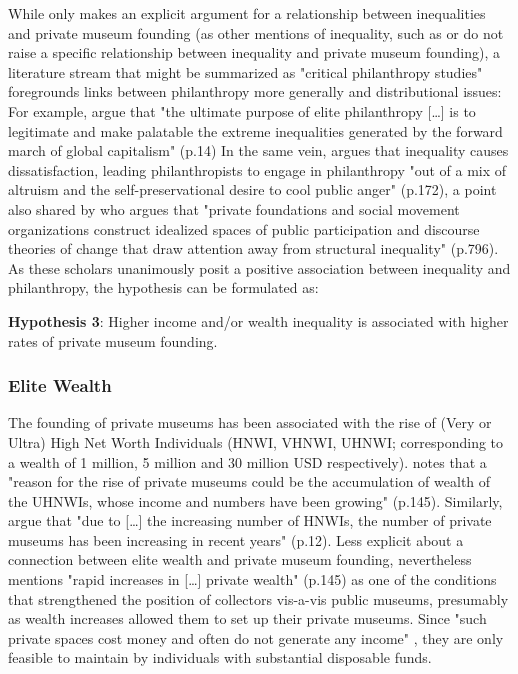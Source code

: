 \documentclass[11pt, authoryear]{elsarticle}
\begin{document}
While only \citet{Brown_2019_private}  makes an explicit argument for a relationship between inequalities and private museum founding (as other mentions of inequality, such as \citet{KalbCosmo_2020_museum} or \citet{Adam_2021_rise} do not raise a specific relationship between inequality and private museum founding), a literature stream that might be summarized as "critical philanthropy studies" foregrounds links between philanthropy more generally and distributional issues:
For example, \citet{Maclean_etal_2021_philanthropy} argue that "the ultimate purpose of elite philanthropy [\ldots{}] is to legitimate and make palatable the extreme inequalities generated by the forward march of global capitalism" (p.14)
In the same vein, \citet{Giridharadas_2018_winners} argues that inequality causes dissatisfaction, leading philanthropists to engage in philanthropy "out of a mix of altruism and the self-preservational desire to cool public anger" (p.172), a point also shared by \citet{KohlArenas_2015_selfhelp} who argues that "private foundations and social movement organizations construct idealized spaces of public participation and discourse theories of change that draw attention away from structural inequality" (p.796). 
As these scholars unanimously posit a positive association between inequality and philanthropy, the hypothesis can be formulated as: 

\bigbreak
\noindent
\textbf{Hypothesis 3}: Higher income and/or wealth inequality is associated with higher rates of private museum founding.



\subsubsection*{Elite Wealth}


The founding of private museums has been associated with the rise of (Very or Ultra) High Net Worth Individuals (HNWI, VHNWI, UHNWI; corresponding to a wealth of 1 million, 5 million and 30 million USD respectively).
\citet{Gnyp_2015_collectors} notes that a "reason for the rise of private museums could be the accumulation
of wealth of the UHNWIs, whose income and numbers have been growing" (p.145).
Similarly, \citet{Zorloni_Resch_2016_opportunities} argue that "due to [\ldots{}] the increasing number of HNWIs, the number of private museums has been increasing in recent years" (p.12).
Less explicit about a connection between elite wealth and private museum founding, \citet{Walker_2019_collector} nevertheless mentions "rapid increases in [\ldots{}] private wealth" (p.145) as one of the conditions that strengthened the position of collectors vis-a-vis public museums, presumably as wealth increases allowed them to set up their private museums. 
Since "such private spaces cost money and often do not generate any income" \citep[p.145]{Gnyp_2015_collectors}, they are only feasible to maintain by individuals with substantial disposable funds. 
\end{document}
